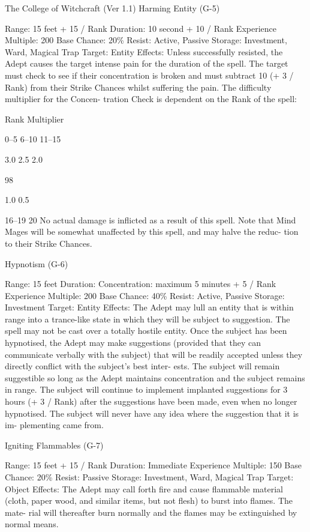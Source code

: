 \begin{Chapter}{The College of Witchcraft (Ver 1.1)}
Harming Entity (G-5) 

Range: 15 feet + 15 / Rank 
Duration: 10 second + 10 / Rank 
Experience Multiple: 200 
Base Chance: 20\% 
Resist: Active, Passive 
Storage: Investment, Ward, Magical Trap 
Target: Entity 
Effects:  Unless  successfully  resisted,  the  Adept 
causes  the  target  intense  pain  for  the  duration  of 
the  spell.  The  target  must  check  to  see  if  their 
concentration is broken and must subtract 10 (+ 3 / 
Rank)  from  their  Strike  Chances  whilst  suffering 
the  pain.  The  difficulty  multiplier  for  the  Concen-
tration  Check  is  dependent  on  the  Rank  of  the 
spell: 

Rank  Multiplier 

0–5 
6–10 
11–15 

3.0 
2.5 
2.0 

98 

1.0 
0.5 

16–19 
20 
No  actual  damage  is  inflicted  as  a  result  of  this 
spell.  Note  that  Mind  Mages  will  be  somewhat 
unaffected  by  this  spell,  and  may  halve  the  reduc-
tion to their Strike Chances. 

Hypnotism (G-6) 

Range: 15 feet 
Duration: Concentration: maximum 5 minutes + 5 
/ Rank 
Experience Multiple: 200 
Base Chance: 40\% 
Resist: Active, Passive 
Storage: Investment 
Target: Entity 
Effects: The Adept may lull an entity that is within 
range into a trance-like state in which they will be 
subject  to  suggestion.  The  spell  may  not  be  cast 
over  a  totally  hostile  entity.  Once  the  subject  has 
been hypnotised, the Adept may make suggestions 
(provided that they can communicate verbally with 
the  subject)  that  will  be  readily  accepted  unless 
they  directly  conflict  with  the  subject’s  best  inter-
ests. The subject will remain suggestible so long as 
the  Adept  maintains  concentration  and  the  subject 
remains  in  range.  The  subject  will  continue  to 
implement implanted suggestions for 3 hours (+ 3 / 
Rank)  after  the  suggestions have  been  made,  even 
when no longer hypnotised. The subject will never 
have  any  idea  where  the  suggestion  that  it  is  im-
plementing came from. 

Igniting Flammables (G-7) 

Range: 15 feet + 15 / Rank 
Duration: Immediate 
Experience Multiple: 150 
Base Chance: 20\% 
Resist: Passive 
Storage: Investment, Ward, Magical Trap 
Target: Object 
Effects:  The  Adept  may  call  forth  fire  and  cause 
flammable material (cloth, paper wood, and similar 
items, but not flesh) to burst into flames. The mate-
rial  will  thereafter  burn  normally  and  the  flames 
may be extinguished by normal means. 


\end{Chapter}
